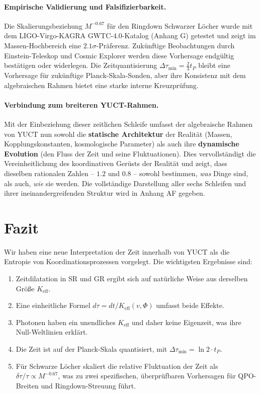 \documentclass[12pt,a4paper]{article}
\newcommand{\Keff}{K_{\mathrm{eff}}}
\begin{document}
	\paragraph{Empirische Validierung und Falsifizierbarkeit.}
	Die Skalierungsbeziehung \(M^{-0.67}\) für den Ringdown Schwarzer Löcher wurde mit dem LIGO-Virgo-KAGRA GWTC-4.0-Katalog (Anhang G) getestet und zeigt im Massen-Hochbereich eine \(2.1\sigma\)-Präferenz. Zukünftige Beobachtungen durch Einstein-Teleskop und Cosmic Explorer werden diese Vorhersage endgültig bestätigen oder widerlegen. Die Zeitquantisierung \(\Delta \tau_{\min} = \frac{2}{3} t_P\) bleibt eine Vorhersage für zukünftige Planck-Skala-Sonden, aber ihre Konsistenz mit dem algebraischen Rahmen bietet eine starke interne Kreuzprüfung.
	
	\paragraph{Verbindung zum breiteren YUCT-Rahmen.}
	Mit der Einbeziehung dieser zeitlichen Schleife umfasst der algebraische Rahmen von YUCT nun sowohl die \textbf{statische Architektur} der Realität (Massen, Kopplungskonstanten, kosmologische Parameter) als auch ihre \textbf{dynamische Evolution} (den Fluss der Zeit und seine Fluktuationen). Dies vervollständigt die Vereinheitlichung des koordinativen Gerüsts der Realität und zeigt, dass dieselben rationalen Zahlen – \(1.2\) und \(0.8\) – sowohl bestimmen, \emph{was} Dinge sind, als auch, \emph{wie} sie werden. Die vollständige Darstellung aller sechs Schleifen und ihrer ineinandergreifenden Struktur wird in Anhang AF gegeben.
	
	\section{Fazit}
	
	Wir haben eine neue Interpretation der Zeit innerhalb von YUCT als die Entropie von Koordinationsprozessen vorgelegt. Die wichtigsten Ergebnisse sind:
	\begin{enumerate}
		\item Zeitdilatation in SR und GR ergibt sich auf natürliche Weise aus derselben Größe \(\Keff\).
		\item Eine einheitliche Formel \(d\tau = dt/\Keff(v,\Phi)\) umfasst beide Effekte.
		\item Photonen haben ein unendliches \(\Keff\) und daher keine Eigenzeit, was ihre Null-Weltlinien erklärt.
		\item Die Zeit ist auf der Planck-Skala quantisiert, mit \(\Delta \tau_{\min} = \ln 2 \cdot t_P\).
		\item Für Schwarze Löcher skaliert die relative Fluktuation der Zeit als \(\delta\tau/\tau \propto M^{-0.67}\), was zu zwei spezifischen, überprüfbaren Vorhersagen für QPO-Breiten und Ringdown-Streuung führt.
	\end{enumerate}
	
\end{document}
